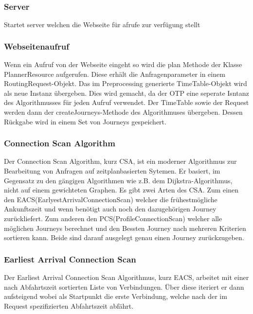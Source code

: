 \subsubsection{Server}
Startet server welchen die Webseite für afrufe zur verfügung stellt
\subsubsection{Webseitenaufruf}
Wenn ein Aufruf von der Webseite eingeht so wird die plan Methode der Klasse PlannerResource aufgerufen. Diese erhält die Anfragenparameter in einem RoutingRequest-Objekt. Das im Preprocessing generierte TimeTable-Objekt wird als neue Instanz übergeben. Dies wird gemacht, da der OTP eine seperate Isntanz des Algorithmusses für jeden Aufruf verwendet. Der TimeTable sowie der Request werden dann der createJourneys-Methode des Algorithmuses übergeben. Dessen Rückgabe wird in einem Set von Journeys gespeichert.

\subsubsection{Connection Scan Algorithm}
Der Connection Scan Algorithm, kurz CSA,  ist ein moderner Algorithmus zur Bearbeitung von Anfragen auf zeitplanbasierten Sytemen. Er basiert, im Gegensatz zu den gängigen Algorithmen wie z.B. dem Dijkstra-Algorithmus, nicht auf einem gewichteten Graphen. 
Es gibt zwei Arten des CSA. Zum einen den EACS(EarlyestArrivalConnectionScan) welcher die frühestmögliche Ankunftszeit und wenn benötigt auch noch den dazugehörigen Journey zurückliefert. Zum anderen den PCS(ProfileConnectionScan) welcher alle möglichen Journeys berechnet und den Bessten Journey nach mehreren Kriterien sortieren kann. Beide sind darauf ausgelegt genau einen Journey zurückzugeben.

\subsubsection{Earliest Arrival Connection Scan}
Der Earliest Arrival Connection Scan Algorithmus, kurz EACS, arbeitet mit einer nach Abfahrtszeit sortierten Liste von Verbindungen. Über diese iteriert er dann aufsteigend wobei als Startpunkt die erste Verbindung, welche nach der im Request spezifizierten Abfahrtszeit abfährt. 

